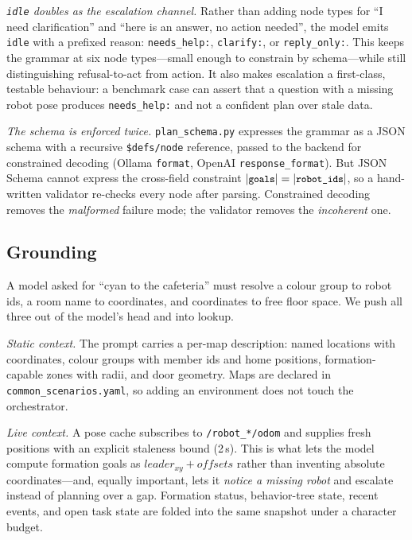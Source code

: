 \documentclass[10pt,twocolumn]{article}
\newcommand{\code}[1]{\texttt{\small #1}}
\begin{document}
\emph{\code{idle} doubles as the escalation channel.} Rather than adding node
types for ``I need clarification'' and ``here is an answer, no action needed'',
the model emits \code{idle} with a prefixed reason: \code{needs\_help:},
\code{clarify:}, or \code{reply\_only:}. This keeps the grammar at six node
types---small enough to constrain by schema---while still distinguishing
refusal-to-act from action. It also makes escalation a first-class, testable
behaviour: a benchmark case can assert that a question with a missing robot
pose produces \code{needs\_help:} and not a confident plan over stale data.

\emph{The schema is enforced twice.} \code{plan\_schema.py} expresses the
grammar as a JSON schema with a recursive \code{\$defs/node} reference, passed
to the backend for constrained decoding (Ollama \code{format}, OpenAI
\code{response\_format}). But JSON Schema cannot express the cross-field
constraint $|\code{goals}| = |\code{robot\_ids}|$, so a hand-written validator
re-checks every node after parsing. Constrained decoding removes the
\emph{malformed} failure mode; the validator removes the \emph{incoherent} one.

\subsection{Grounding}
\label{sec:grounding}

A model asked for ``cyan to the cafeteria'' must resolve a colour group to
robot ids, a room name to coordinates, and coordinates to free floor space. We
push all three out of the model's head and into lookup.

\emph{Static context.} The prompt carries a per-map description: named
locations with coordinates, colour groups with member ids and home positions,
formation-capable zones with radii, and door geometry. Maps are declared in
\code{common\_scenarios.yaml}, so adding an environment does not touch the
orchestrator.

\emph{Live context.} A pose cache subscribes to \code{/robot\_*/odom} and
supplies fresh positions with an explicit staleness bound (2\,s). This is what
lets the model compute formation goals as $\textit{leader}_{xy} + \textit{offsets}$
rather than inventing absolute coordinates---and, equally important, lets it
\emph{notice a missing robot} and escalate instead of planning over a gap.
Formation status, behavior-tree state, recent events, and open task state are
folded into the same snapshot under a character budget.
\end{document}
